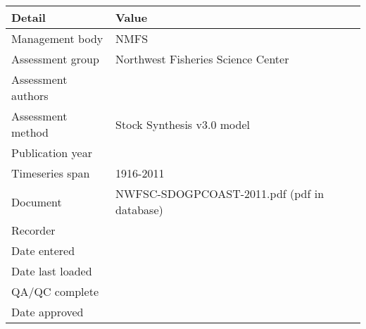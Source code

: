 \begin{table}[htb]
\centering
\begin{tabular}{lp{7cm}}
\toprule
Detail & Value \\
\midrule
Management body    & NMFS                                        \\
Assessment group   & Northwest Fisheries Science Center          \\
Assessment authors &                                             \\
Assessment method  & Stock Synthesis v3.0 model                  \\
Publication year   &                                             \\
Timeseries span    & 1916-2011                                   \\
Document           & NWFSC-SDOGPCOAST-2011.pdf (pdf in database) \\
Recorder           &                                             \\
Date entered       &                                             \\
Date last loaded   &                                             \\
QA/QC complete     &                                             \\
Date approved      &                                             \\
\bottomrule
\end{tabular}
\label{tab:assessdet}
\end{table}
